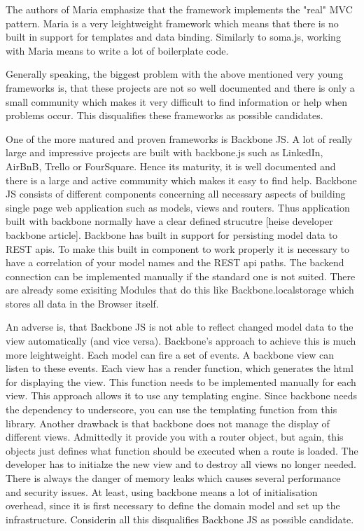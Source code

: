 The authors of Maria emphasize that the framework implements the "real" MVC pattern. Maria is a very leightweight framework which means that there is no built in support for templates and data binding. Similarly to soma.js, working with Maria means to write a lot of boilerplate code. 


Generally speaking, the biggest problem with the above mentioned very young frameworks is, that these projects are not so well documented and there is only a small community which makes it very difficult to find information or help when problems occur. This disqualifies these frameworks as possible candidates.


One of the more matured and proven frameworks is Backbone JS. A lot of really large and impressive projects are built with backbone.js such as LinkedIn, AirBnB, Trello or FourSquare. Hence its maturity, it is well documented and there is a large and active community which makes it easy to find help. Backbone JS  consists of different components concerning all necessary aspects of building single page web application such as models, views and routers. Thus application built with backbone normally have a clear defined strucutre [heise developer backbone article]. Backbone has built in support for persisting model data to REST apis. To make this built in component to work properly it is necessary to have a correlation of your model names and the REST api paths. The backend connection can be implemented manually if the standard one is not suited. There are already some exisiting Modules that do this like Backbone.localstorage which stores all data in the Browser itself. 


An adverse is, that Backbone JS is not able to reflect changed model data to the view automatically (and vice versa). Backbone's approach to achieve this is much more leightweight. Each model can fire a set of events. A backbone view can listen to these events. Each view has a render function, which generates the html for displaying the view. This function needs to be implemented manually for each view. This approach allows it to use any templating engine. Since backbone needs the dependency to underscore, you can use the templating function from this library. Another drawback is that backbone does not manage the display of different views. Admittedly it provide you with a router object, but again, this objects just defines what function should be executed when a route is loaded. The developer has to initialze the new view and to destroy all views no longer needed. There is always the danger of memory leaks which causes several performance and security issues. At least, using backbone means a lot of initialisation overhead, since it is first necessary to define the domain model and set up the infrastructure. Considerin all this disqualifies Backbone JS as possible candidate.       


